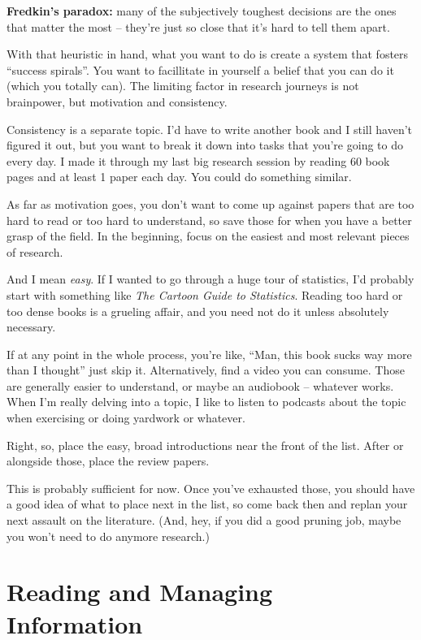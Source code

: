 \textbf{Fredkin's paradox:} many of the subjectively toughest decisions are the ones that
matter the most -- they're just so close that it's hard to tell them apart. 

With that heuristic in hand, what you want to do is create a system that fosters ``success spirals''. You want to facillitate in yourself a belief that you can do it (which
you totally can). The limiting factor in research journeys is not brainpower, but motivation and consistency.

Consistency is a separate topic. I'd have to write another book and I still
haven't figured it out, but you want to break it down into tasks that you're
going to do every day. I made it through my last big research session by
reading 60 book pages and at least 1 paper each day. You could do something similar.

As far as motivation goes, you don't want to come up against
papers that are too hard to read or too hard to understand, so save those for
when you have a better grasp of the field. In the beginning, focus on the
easiest and most relevant pieces of research.

And I mean \textit{easy}. If I wanted to go through a huge tour of statistics,
I'd probably start with something like \textit{The Cartoon Guide to
  Statistics}. Reading too hard or too dense books is a grueling affair, and you
need not do it unless absolutely necessary.

If at any point in the whole process, you're like, ``Man, this book sucks way
more than I thought'' just skip it. Alternatively, find a video you can
consume. Those are generally easier to understand, or maybe an audiobook -- whatever works. When I'm really delving into a topic, I
like to listen to podcasts about the topic when exercising or doing yardwork or whatever.


Right, so, place the easy, broad introductions near the front of the list. After
or alongside those, place the review papers.

This is probably sufficient for now. Once you've exhausted those, you should
have a good idea of what to place next in the list, so come back then and replan
your next assault on the literature. (And, hey, if you did a good pruning job,
maybe you won't need to do anymore research.)

\section{Reading and Managing Information}

